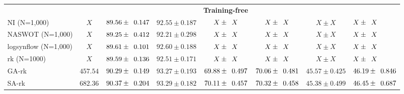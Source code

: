 \documentclass[sigconf]{acmart}
\begin{document}
\begin{table*}[htb]
\begin{tabular}{@{}lccccccl@{}}
        &&&&\textbf{Training-free}&&&\\
        NI (N=1,000) & $X$ & $89.56\pm \z{0.147}$ & $92.55\pm 0.187$ & $X\pm \z{X}$ & $X\pm \z{X}$ & $X\pm X$ & $X\pm \z{X}$ \\ 
        NASWOT (N=1,000) & $X$ & $89.25\pm \z{0.412}$ & $92.21\pm 0.298$ & $X\pm \z{X}$ & $X\pm \z{X}$ & $X\pm X$ & $X\pm \z{X}$ \\ 
        logsynflow (N=1,000) & $X$ & $89.61\pm \z{0.101}$ & $92.60\pm 0.188$ & $X\pm \z{X}$ & $X\pm \z{X}$ & $X\pm X$ & $X\pm \z{X}$ \\ 
        rk (N=1000) & $X$ & $89.59\pm \z{0.136}$ & $92.51\pm 0.171$ & $X\pm \z{X}$ & $X\pm \z{X}$ & $X\pm X$ & $X\pm \z{X}$ \\ 
        GA-rk & $457.54$ & $90.29\pm \z{0.149}$ & $93.27\pm0.193$ & $69.88\pm \z{0.497}$ & $70.06\pm \z{0.481}$ & $45.57\pm 0.425$ & $46.19\pm \z{0.846}$ \\ 
        SA-rk & $682.36$ & $90.37\pm \z{0.204}$ & $93.29\pm0.182$ & $70.11\pm \z{0.457}$ & $70.32\pm \z{0.458}$ & $45.38\pm 0.499$ & $46.45\pm \z{0.687}$ \\ \bottomrule
        \end{tabular}
        \label{table:overall_sss}
          \vspace{-\baselineskip}
      \end{table*}
\end{document}
